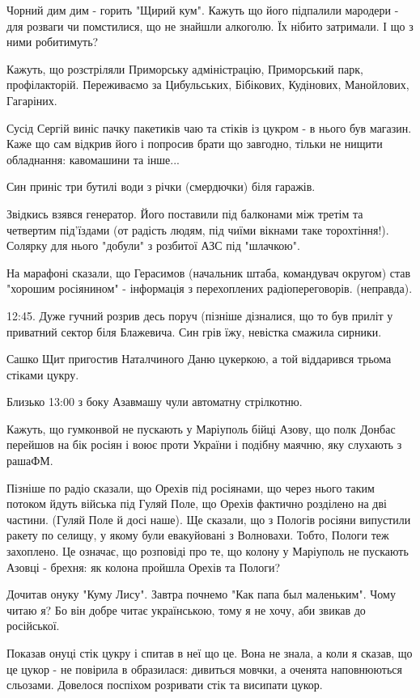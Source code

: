 Чорний дим дим - горить "Щирий кум". Кажуть що його підпалили мародери - для
розваги чи помстилися, що не знайшли алкоголю. Їх нібито затримали. І що з ними
робитимуть?

Кажуть, що розстріляли Приморську адміністрацію, Приморський парк,
профілакторій. Переживаємо за Цибульських, Бібікових, Кудінових, Манойлових,
Гагаріних.

Сусід Сергій виніс пачку пакетиків чаю та стіків із цукром - в нього був
магазин. Каже що сам відкрив його і попросив брати що завгодно, тільки не
нищити обладнання: кавомашини та інше...

Син приніс три бутилі води з річки (смердючки) біля гаражів.

Звідкись взявся генератор. Його поставили під балконами між третім та четвертим
під'їздами (от радість людям, під чиїми вікнами таке торохтіння!). Солярку для
нього "добули" з розбитої АЗС  під "шлачкою".

На марафоні сказали, що Герасимов (начальник штаба, командувач округом) став
"хорошим росіянином" - інформація з перехоплених радіопереговорів. (неправда).

12:45. Дуже гучний розрив десь поруч (пізніше дізналися, що то був приліт у
приватний сектор біля Блажевича. Син грів їжу, невістка смажила сирники.

Сашко Щит пригостив Наталчиного Даню цукеркою, а той віддарився трьома стіками
цукру.

Близько 13:00 з боку Азавмашу чули автоматну стрілкотню. 

Кажуть, що гумконвой не пускають у Маріуполь бійці Азову, що полк Донбас
перейшов на бік росіян і воює проти України і подібну маячню, яку слухають з
рашаФМ.

Пізніше по радіо сказали, що Орехів під росіянами, що через нього таким потоком
йдуть війська під Гуляй Поле, що Орехів фактично розділено на дві частини.
(Гуляй Поле й досі наше). Ще сказали, що з Пологів росіяни випустили ракету по
селищу, у якому були евакуйовані з Волновахи. Тобто, Пологи теж захоплено. Це
означає, що розповіді про те, що колону у Маріуполь не пускають Азовці -
брехня: як колона пройшла Орехів та Пологи?

Дочитав онуку "Куму Лису". Завтра почнемо "Как папа был маленьким". Чому читаю
я? Бо він добре читає українською, тому я не хочу, аби звикав до російської.

Показав онуці стік цукру і спитав в неї що це. Вона не знала, а коли я сказав,
що це цукор - не повірила в образилася: дивиться мовчки, а оченята наповнюються
сльозами. Довелося поспіхом розривати стік та висипати цукор.

